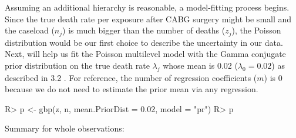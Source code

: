 \documentclass[article]{jss}
\begin{document}
Assuming an additional hierarchy is reasonable, a model-fitting process begins.  Since the true death rate per exposure after CABG surgery might be small and the caseload ($n_{j}$) is much bigger than the number of deaths ($z_{j}$), the Poisson distribution would be our first choice to describe the uncertainty in our data. Next,  will help us fit the Poisson multilevel model with the Gamma conjugate prior distribution on the true death rate $\lambda_{j}$ whose mean is 0.02 ($\lambda_{0}=0.02$) as described in 3.2 . For reference, the number of regression coefficients ($m$) is 0 because we do not need to estimate the prior mean via any regression.
\begin{CodeChunk}
\begin{CodeInput}
R> p <- gbp(z, n, mean.PriorDist = 0.02, model = "pr")
R> p
\end{CodeInput}
\begin{CodeOutput}
Summary for whole observations: 


\end{CodeOutput}
\end{CodeChunk}
\end{document}
